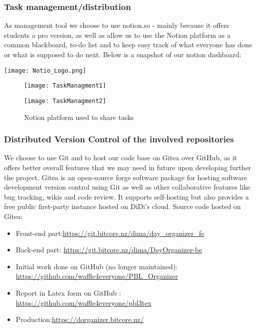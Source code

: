 \subsubsection{Task management/distribution}
\par As management tool we choose to use notion.so - mainly because it offers students a pro version, as well as allow us to use the Notion platform as a common blackboard, to-do list and to keep easy track of what everyone has done or what is supposed to do next.
Below is a snapshot of our notion dashboard:
\par 
\texttt{[image: Notio\_Logo.png]}
\par
\begin{figure}[!h]

	
	
	\texttt{[image: TaskManagment1]}
	
	\texttt{[image: TaskManagment2]}
	\caption {Notion platform used to share tasks}
\end{figure}


\subsubsection{Distributed Version Control of the involved repositories}
\par We choose to use Git and to host our code base on Gitea over GitHub, as it offers better overall features that we may need in future upon developing further the project. 
Gitea is an open-source forge software package for hosting software development version control using Git as well as other collaborative features like bug tracking, wikis and code review. It supports self-hosting but also provides a free public first-party instance hosted on DiDi's cloud.
Source code hosted on Gitea:
\\
\begin{itemize}
 \item Front-end part:\url{https://git.bitcore.nz/dima/day_organizer_fe}\\
 \item Back-end part: \url{https://git.bitcore.nz/dima/DayOrganizer-be}\\
 \item Initial work done on GitHub (no longer maintained):\url{ https://github.com/waffle4everyone/PBL_Organizer	}
 \item Report in Latex form on GitHub :\url{ https://github.com/waffle4everyone/pbl3tex}
 \item Production:\url {https://dorganizer.bitcore.nz/ }
  
\end{itemize}
  

